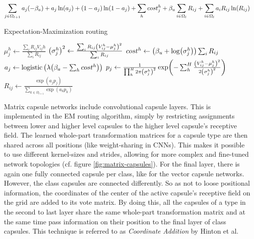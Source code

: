 \begin{align}
    \sum_{j\in\Omega_{l+1}}a_j\qty(-\beta_a)+a_j \ln(a_j)+(1-a_j)\ln(1-a_j)+\sum_h cost_j^h+\beta_u\sum_{i\in\Omega_l}R_{ij}+\sum_{i\in\Omega_l}a_i R_{ij} \ln(R_{ij})\label{eq:objective-function}
\end{align}
\begin{algorithm}
\caption{Expectation-Maximization routing}\label{alg:em-routing}
\begin{algorithmic}[1]
        \EndFor
    \EndFor
            \State{}
        \EndFor
            \State{}
        \EndFor
    \EndFor
    \State{}
\EndProcedure
{}
    \EndFor
        \State $\mu_{j}^h \gets \frac{\sum_i R_{ij} V_{ij}h}{\sum_i R_{ij}}$
        \State $\qty(\sigma_j^h)^2 \gets \frac{\sum_i R_{ij} \qty(V_{ij}^h-\mu_j^h)^2}{\sum_i R_{ij}}$
        \State $cost^h \gets \qty(\beta_u + \log(\sigma_j^h))\sum_i R_{ij}$
    \EndFor
    \State $a_j \gets \operatorname{logistic}\qty(\lambda\qty(\beta_a - \sum_h cost^h))$
    \State{}
\EndProcedure
{}
        \State $p_j \gets \frac{1}{\prod_h^H 2\pi \qty(\sigma_j^h)^2}\exp(-\sum_h^H\frac{\qty(V_{ij}^h-\mu_j^h)^2}{2\qty(\sigma_j^h)^2})$
        \State $R_{ij} \gets \frac{\exp(a_j p_j)}{\sum_{k\in\Omega_{l+1}} \exp(a_k p_k)}$
        \State{}
    \EndFor
\EndProcedure
\end{algorithmic}
\end{algorithm}
Matrix capsule networks include convolutional capsule layers. This is implemented in the EM routing algorithm, simply by restricting assignments between lower and higher level capsules to the higher level capsule's receptive field. The learned whole-part transformation matrices for a capsule type are then shared across all positions (like weight-sharing in CNNs). This makes it possible to use different kernel-sizes and strides, allowing for more complex and fine-tuned network topologies (cf. figure \ref{fig:matrix-capsules}). For the final layer, there is again one fully connected capsule per class, like for the vector capsule networks. However, the class capsules are connected differently. So as not to loose positional information, the coordinates of the center of the active capsule's receptive field on the grid are added to its vote matrix. By doing this, all the capsules of a type in the second to last layer share the same whole-part transformation matrix and at the same time pass information on their position to the final layer of class capsules. This technique is referred to as \emph{Coordinate Addition} by Hinton et al.
